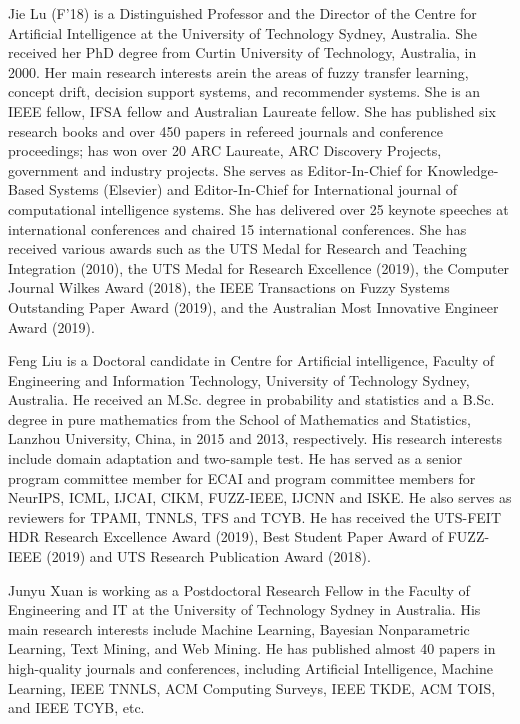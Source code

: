 \documentclass[journal]{IEEEtran}
\begin{document}
\begin{IEEEbiography}{Jie Lu} (F’18) is a Distinguished Professor and the Director of the Centre for Artificial Intelligence at the University of Technology Sydney, Australia. She received her PhD degree from Curtin University of Technology, Australia, in 2000. Her main research interests arein the areas of fuzzy transfer learning, concept drift, decision support systems, and recommender systems. She is an IEEE fellow, IFSA fellow and Australian Laureate fellow. She has published six research books and over 450 papers in refereed journals and conference proceedings; has won over 20 ARC Laureate, ARC Discovery Projects, government and industry projects. She serves as Editor-In-Chief for Knowledge-Based Systems (Elsevier) and Editor-In-Chief for International journal of computational intelligence systems. She has delivered over 25 keynote speeches at international conferences and chaired 15 international conferences. She has received various awards such as the UTS Medal for Research and Teaching Integration (2010), the UTS Medal for Research Excellence (2019), the Computer Journal Wilkes Award (2018), the IEEE Transactions on Fuzzy Systems Outstanding Paper Award (2019), and the Australian Most Innovative Engineer Award (2019).
\end{IEEEbiography}


\begin{IEEEbiography}{Feng Liu}
is a Doctoral candidate in Centre for Artificial intelligence, Faculty of Engineering and Information Technology, University of Technology Sydney, Australia. He received an M.Sc. degree in probability and statistics and a B.Sc. degree in pure mathematics from the School of Mathematics and Statistics, Lanzhou University, China, in 2015 and 2013, respectively. His research interests include domain adaptation and two-sample test. He has served as a senior program committee member for ECAI and program committee members for NeurIPS, ICML, IJCAI, CIKM, FUZZ-IEEE, IJCNN and ISKE. He also serves as reviewers for TPAMI, TNNLS, TFS and TCYB. He has received the UTS-FEIT HDR Research Excellence Award (2019), Best Student Paper Award of FUZZ-IEEE (2019) and UTS Research Publication Award (2018).
\end{IEEEbiography}


\begin{IEEEbiography}{Junyu Xuan}
is working as a Postdoctoral Research Fellow in the Faculty of Engineering and IT at the University of Technology Sydney in Australia. His main research interests include Machine Learning, Bayesian Nonparametric Learning, Text Mining, and Web Mining. He has published almost 40 papers in high-quality journals and conferences, including Artificial Intelligence, Machine Learning, IEEE TNNLS, ACM Computing Surveys, IEEE TKDE, ACM TOIS, and IEEE TCYB, etc.
\end{IEEEbiography}
\end{document}
